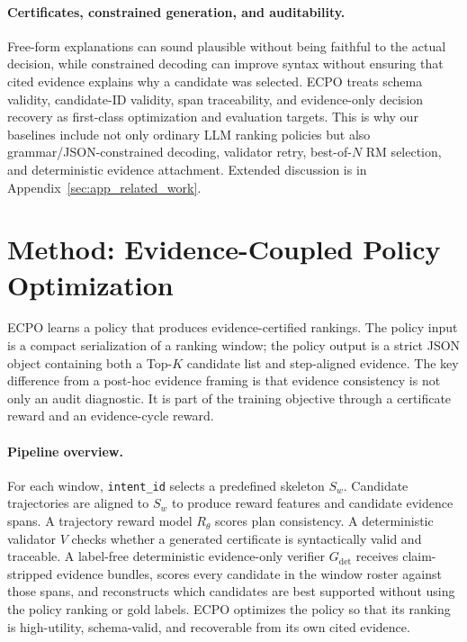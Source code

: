 \documentclass{article}
\newcommand{\Gdet}{G_{\mathrm{det}}}
\begin{document}
\paragraph{Certificates, constrained generation, and auditability.}
Free-form explanations can sound plausible without being faithful to the actual decision, while constrained decoding can improve syntax without ensuring that cited evidence explains why a candidate was selected. ECPO treats schema validity, candidate-ID validity, span traceability, and evidence-only decision recovery as first-class optimization and evaluation targets. This is why our baselines include not only ordinary LLM ranking policies but also grammar/JSON-constrained decoding, validator retry, best-of-$N$ RM selection, and deterministic evidence attachment. Extended discussion is in Appendix~\ref{sec:app_related_work}.

\section{Method: Evidence-Coupled Policy Optimization}
\label{sec:method}

ECPO learns a policy that produces evidence-certified rankings. The policy input is a compact serialization of a ranking window; the policy output is a strict JSON object containing both a Top-$K$ candidate list and step-aligned evidence. The key difference from a post-hoc evidence framing is that evidence consistency is not only an audit diagnostic. It is part of the training objective through a certificate reward and an evidence-cycle reward.

\paragraph{Pipeline overview.}
For each window, \texttt{intent\_id} selects a predefined skeleton $S_w$. Candidate trajectories are aligned to $S_w$ to produce reward features and candidate evidence spans. A trajectory reward model $R_\theta$ scores plan consistency. A deterministic validator $V$ checks whether a generated certificate is syntactically valid and traceable. A label-free deterministic evidence-only verifier $\Gdet$ receives claim-stripped evidence bundles, scores every candidate in the window roster against those spans, and reconstructs which candidates are best supported without using the policy ranking or gold labels. ECPO optimizes the policy so that its ranking is high-utility, schema-valid, and recoverable from its own cited evidence.
\end{document}
